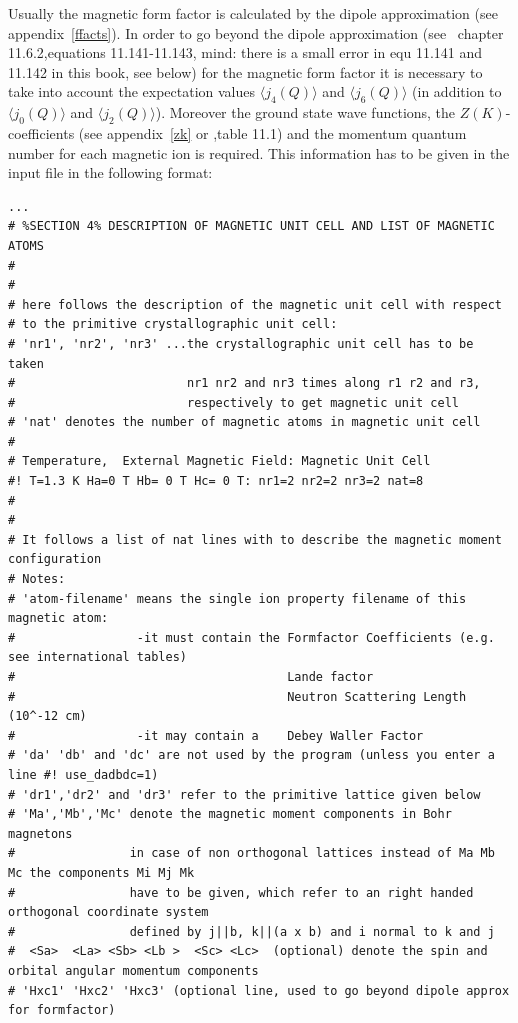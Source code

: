 Usually the magnetic form factor is calculated by the dipole approximation (see appendix~\ref{ffacts}).
In order to go beyond the dipole approximation (see~\cite{lovesey84-1} chapter 11.6.2,equations 
11.141-11.143, mind: there is a small error in equ 11.141 and 11.142 in this book, see below) for the 
magnetic form factor it is necessary to take into account the expectation values
$\langle j_4(Q) \rangle$ and $\langle j_6(Q) \rangle$ 
(in addition to $\langle j_0(Q) \rangle$ and $\langle j_2(Q) \rangle$). 
Moreover the ground state wave functions, the $Z(K)$-coefficients (see appendix~\ref{zk}
or \cite{lovesey84-1},table 11.1)
and the momentum quantum number for each magnetic ion is required. This
information has to be given in the input file 
in the following format:

{\footnotesize
\begin{verbatim}
...
# %SECTION 4% DESCRIPTION OF MAGNETIC UNIT CELL AND LIST OF MAGNETIC ATOMS
#
#
# here follows the description of the magnetic unit cell with respect
# to the primitive crystallographic unit cell:
# 'nr1', 'nr2', 'nr3' ...the crystallographic unit cell has to be taken 
#                        nr1 nr2 and nr3 times along r1 r2 and r3,
#                        respectively to get magnetic unit cell
# 'nat' denotes the number of magnetic atoms in magnetic unit cell
#
# Temperature,  External Magnetic Field: Magnetic Unit Cell
#! T=1.3 K Ha=0 T Hb= 0 T Hc= 0 T: nr1=2 nr2=2 nr3=2 nat=8 
#
#
# It follows a list of nat lines with to describe the magnetic moment configuration
# Notes:
# 'atom-filename' means the single ion property filename of this magnetic atom:
#                 -it must contain the Formfactor Coefficients (e.g. see international tables)
#                                      Lande factor
#                                      Neutron Scattering Length (10^-12 cm) 
#                 -it may contain a    Debey Waller Factor
# 'da' 'db' and 'dc' are not used by the program (unless you enter a line #! use_dadbdc=1)
# 'dr1','dr2' and 'dr3' refer to the primitive lattice given below
# 'Ma','Mb','Mc' denote the magnetic moment components in Bohr magnetons
#                in case of non orthogonal lattices instead of Ma Mb Mc the components Mi Mj Mk
#                have to be given, which refer to an right handed orthogonal coordinate system 
#                defined by j||b, k||(a x b) and i normal to k and j
#  <Sa>  <La> <Sb> <Lb >  <Sc> <Lc>  (optional) denote the spin and orbital angular momentum components 
# 'Hxc1' 'Hxc2' 'Hxc3' (optional line, used to go beyond dipole approx for formfactor)

\end{verbatim}}
